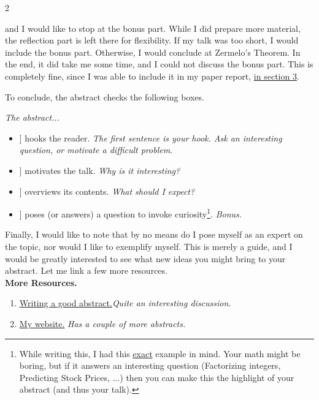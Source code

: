 \documentclass[12pt]{article}
\begin{document}
\begin{example}
\begin{multicols}{2}
        \end{multicols}
        \noindent
        and I would like to stop at the bonus part. While I did prepare more material, the reflection part is left there for flexibility. If my talk was too short, I would include the bonus part. Otherwise, I would conclude at Zermelo's Theorem. In the end, it did take me some time, and I could not discuss the bonus part. This is completely fine, since I was able to include it in my paper report, \href{https://elshenawyom.github.io/assets/pdf/zermelo\_paper.pdf}{in section 3}.
    \end{example}

\newpage

To conclude, the abstract checks the following boxes.

\emph{The abstract...}
\begin{itemize}
    \item[[~]] hooks the reader. \hfill \emph{The first sentence is your hook. Ask an interesting question, or motivate a difficult problem.}
    \item[[~]] motivates the talk. \hfill \emph{Why is it interesting? }
    \item[[~]] overviews its contents. \hfill \emph{What should I expect?}
    \item[[~]] poses (or answers) a question to invoke curiosity\footnote{While writing this, I had this \href{https://mathoverflow.net/a/210344}{exact} example in mind. Your math might be boring, but if it answers an interesting question (Factorizing integers, Predicting Stock Prices, ...) then you can make this the highlight of your abstract (and thus your talk).}. \hfill \emph{Bonus.}
\end{itemize}
Finally, I would like to note that by no means do I pose myself as an expert on the topic, nor would I like to exemplify myself. This is merely a guide, and I would be greatly interested to see what new ideas you might bring to your abstract. Let me link a few more resources.\\

\textbf{More Resources.}

\begin{enumerate}
\item \href{https://mathoverflow.net/questions/210340/how-to-write-an-abstract-for-a-math-paper}{Writing a good abstract.}\hfill \emph{Quite an interesting discussion.}
\item \href{https://elshenawyom.github.io/seminars-talks/}{My website.} \hfill \emph{Has a couple of more abstracts.}
\end{enumerate}
\end{document}
